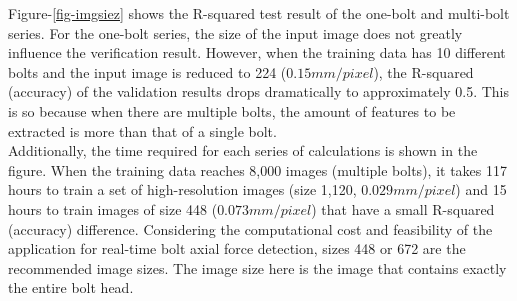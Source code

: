 \documentclass{proc-a4}
\begin{document}
Figure-\ref{fig-imgsiez} shows the R-squared test result of the one-bolt and multi-bolt series. For the one-bolt series, the size of the input image does not greatly influence the verification result. However, when the training data has 10 different bolts and the input image is reduced to 224 ($0.15 mm/pixel$), the R-squared (accuracy) of the validation results drops dramatically to approximately  0.5. This is so because when there are multiple bolts, the amount of features to be extracted is more than that of a single bolt. \\
Additionally, the time required for each series of calculations is shown in the figure. When the training data reaches 8,000 images (multiple bolts), it takes 117 hours to train a set of high-resolution images (size 1,120, $0.029 mm/pixel$) and 15 hours to train images of size 448 ($0.073 mm/pixel$) that have a small R-squared (accuracy) difference. Considering the computational cost and feasibility of the application for real-time bolt axial force detection, sizes 448 or 672 are the recommended image sizes. The image size here is the image that contains exactly the entire bolt head.

\begin{figure*}
    \centering
{}
    \caption{the R-squared and time test result of one-bolt series and multi-bolt series}
    \label{fig-imgsiez}
\end{figure*}
\end{document}
